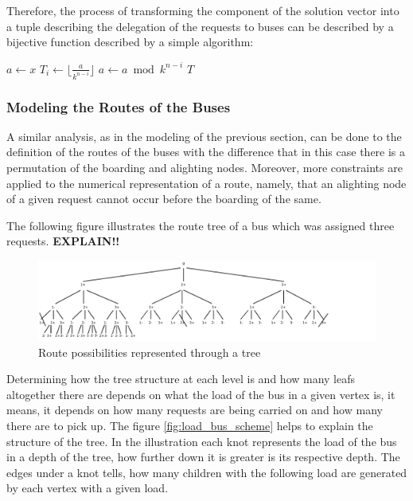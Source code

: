 \documentclass[tuberlin,cic,tc,openright,english,noabntcite,oneside]{iiufrgs}
\begin{document}
Therefore, the process of transforming the component of the solution vector into a tuple describing the delegation of the requests to buses can be described by a bijective function described by a simple algorithm:

\begin{algorithmic}
\State $a \gets x$
	\State $\displaystyle T_{i} \gets \lfloor \frac{a}{k^{n-i}} \rfloor$
	\State $a \gets a \bmod k^{n-i}$
\EndFor
\State \Return $T$
\EndFunction
\end{algorithmic}

\subsubsection{Modeling the Routes of the Buses}
A similar analysis, as in the modeling of the previous section, can be done to the definition of the routes of the buses with the difference that in this case there is a permutation of the boarding and alighting nodes. Moreover, more constraints are applied to the numerical representation of a route, namely, that an alighting node of a given request cannot occur before the boarding of the same.

The following figure illustrates the route tree of a bus which was assigned three requests. \textbf{EXPLAIN!!}

\begin{figure}[H]
    \caption{Route possibilities represented through a tree}
    \begin{center}
        \includegraphics[scale=0.9]{fig_tree_bus_route}
    \end{center}
    \label{fig:tree_bus_route}
\end{figure}

Determining how the tree structure at each level is and how many leafs altogether there are depends on what the load of the bus in a given vertex is, it means, it depends on how many requests are being carried on and how many there are to pick up. The figure \ref{fig:load_bus_scheme} helps to explain the structure of the tree. In the illustration each knot represents the load of the bus in a depth of the tree, how further down it is greater is its respective depth. The edges under a knot tells, how many children with the following load are generated by each vertex with a given load.
\end{document}
